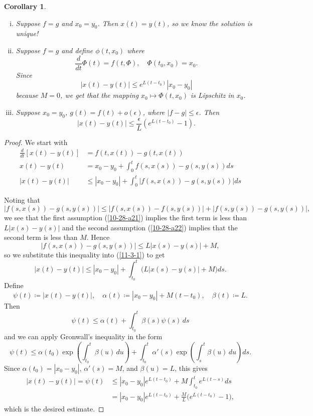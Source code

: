 \documentclass{tufte-handout}
\newtheorem{cor}[thm]{Corollary}
\theoremstyle{definition}
\begin{document}
\begin{cor}
	\begin{enumerate}[(i)]
		\item Suppose $f =g$ and $x_0=y_0$. Then $x(t) = y(t)$, so we know the solution is unique!
		\item Suppose $f=g$ and define $\phi(t,x_0)$ where \[
			\frac{d}{dt}\Phi(t) = f(t,\Phi), \quad \Phi(t_0,x_0) = x_0
		.\] Since \[
			\left| x(t) - y(t) \right| \le e^{L(t-t_0)}\left| x_0-y_0 \right|
			\] because $M = 0$, we get that the mapping $x_0 \mapsto \Phi(t,x_0)$ is Lipschitz in $x_0$. 
		\item Suppose $x_0=y_0$, $g(t) = f(t) + o(\epsilon)$, where $\left| f-g \right|\le \epsilon$. Then \[
			\left| x(t) - y(t) \right| \le \frac{\epsilon}{L} \left( e^{L(t-t_0)} - 1 \right)
		.\] 
	\end{enumerate}
\end{cor}

\begin{proof}
	We start with 
	\begin{align}
		\frac{d}{dt} \left[ x(t) - y(t) \right] &= f(t,x(t)) - g(t,x(t)) \nonumber \\
		x(t) - y(t) &= x_0-y_0 + \int_{0}^{t} f(s,x(s)) - g(s,y(s))ds \nonumber \\
		\left| x(t) - y(t) \right| &\le \left|x_0-y_0\right| + \int_{0}^{t} \left| f(s,x(s)) - g(s,y(s)) \right|ds \label{11-3-1} 
	\end{align}
	
	Noting that \[\left| f(s,x(s)) - g(s,y(s)) \right| \le \left|  f(s,x(s)) - f(s,y(s)) \right| + \left| f(s,y(s)) - g(s,y(s)) \right|,\]
	we see that the first assumption (\ref{10-28-a21}) implies the first term is less than $L \left| x(s) - y(s) \right|$ and the second assumption (\ref{10-28-a22}) implies that the second term is less than $M$. Hence \[
		\left| f(s,x(s)) - g(s,y(s)) \right| \le L \left| x(s) - y(s) \right| + M
	,\]
	so we substitute this inequality into (\ref{11-3-1}) to get
	\[
		\left| x(t) - y(t) \right|
		\le \left| x_0 - y_0 \right|
			+ \int_{t_0}^{t} \big( L \left| x(s) - y(s) \right| + M \big) ds.
	\]
	Define
	\[
		\psi(t) \coloneqq \left| x(t) - y(t) \right|,
		\quad
		\alpha(t) \coloneqq \left| x_0 - y_0 \right| + M(t - t_0),
		\quad
		\beta(t) \coloneqq L.
	\]
	Then
	\[
		\psi(t) \le \alpha(t) + \int_{t_0}^{t} \beta(s)\psi(s)\,ds
	\]
	and we can apply Gronwall's inequality in the form
	\[
		\psi(t)
		\le \alpha(t_0) \exp\left( \int_{t_0}^{t} \beta(u)\,du \right)
			+ \int_{t_0}^{t} \alpha'(s)
				\exp\left( \int_{s}^{t} \beta(u)\,du \right) ds.
	\]
	Since $\alpha(t_0) = \left| x_0 - y_0 \right|$, $\alpha'(s) = M$, and $\beta(u) = L$, this gives
	\begin{align*}
		\left| x(t) - y(t) \right|
			= \psi(t)
			&\le \left| x_0 - y_0 \right| e^{L(t - t_0)}
				+ M \int_{t_0}^{t} e^{L(t - s)} ds \\
			&= \left| x_0 - y_0 \right| e^{L(t - t_0)}
				+ \frac{M}{L} \bigl( e^{L(t - t_0)} - 1 \bigr),
	\end{align*}
	which is the desired estimate.
\end{proof}
\end{document}
